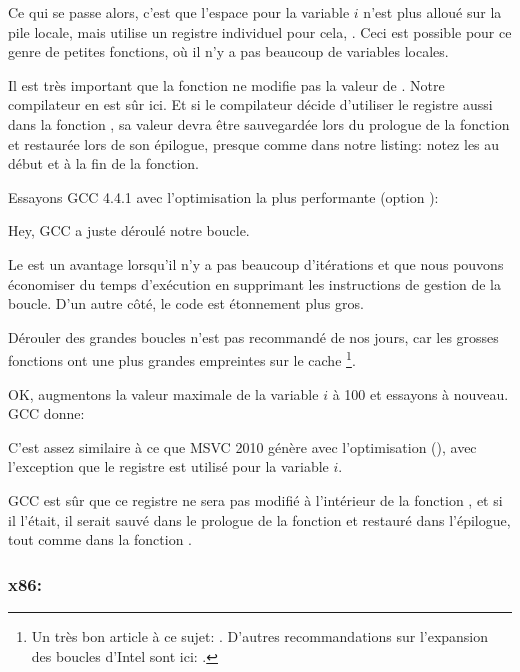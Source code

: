 Ce qui se passe alors, c'est que l'espace pour la variable $i$ n'est plus alloué
sur la pile locale, mais utilise un registre individuel pour cela, \ESI. Ceci est
possible pour ce genre de petites fonctions, où il n'y a pas beaucoup de variables
locales.

Il est très important que la fonction \ttf ne modifie pas la valeur de \ESI.
Notre compilateur en est sûr ici.
Et si le compilateur décide d'utiliser le registre \ESI aussi dans la fonction \ttf,
sa valeur devra être sauvegardée lors du prologue de la fonction et restaurée lors
de son épilogue, presque comme dans notre listing: notez les 
au début et à la fin de la fonction.

Essayons GCC 4.4.1 avec l'optimisation la plus performante (option \Othree):




Hey, GCC a juste déroulé notre boucle.

Le  est un avantage lorsqu'il n'y a pas
beaucoup d'itérations et que nous pouvons économiser du temps d'exécution en supprimant
les instructions de gestion de la boucle.
D'un autre côté, le code est étonnement plus gros.

Dérouler des grandes boucles n'est pas recommandé de nos jours, car les grosses fonctions
ont une plus grandes empreintes sur le cache%
%
\footnote{Un très bon article à ce sujet: \DrepperMemory.
D'autres recommandations sur l'expansion des boucles d'Intel sont ici:
.}.

OK, augmentons la valeur maximale de la variable $i$ à 100 et essayons à nouveau.
GCC donne:



C'est assez similaire à ce que MSVC 2010 génère avec l'optimisation (\Ox), avec l'exception
que le registre \EBX est utilisé pour la variable $i$.

GCC est sûr que ce registre ne sera pas modifié à l'intérieur de la fonction \ttf,
et si il l'était, il serait sauvé dans le prologue de la fonction et restauré dans
l'épilogue, tout comme dans la fonction \main.

\clearpage
\subsubsection{x86: \olly}
\myindex{\olly}

